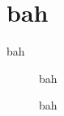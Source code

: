 \documentclass[a4paper,twoside]{memoir}
\begin{document}
\tableofcontents*
\listoffigures*
\listofdirfigures*

\chapter{bah}
\begin{dirfigure}
bah
\caption{bah}
\end{dirfigure}
\begin{figure}
bah
\caption{bah}
\end{figure}
\end{document}

